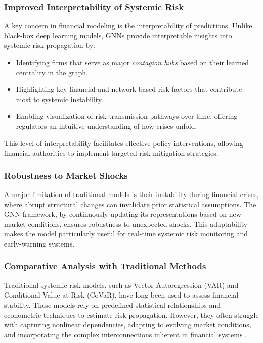 \documentclass[preprint,12pt,authoryear]{elsarticle}
\begin{document}
\subsubsection{Improved Interpretability of Systemic Risk}  

A key concern in financial modeling is the interpretability of predictions. Unlike black-box deep learning models, GNNs provide interpretable insights into systemic risk propagation by:
\begin{itemize}
    \item Identifying firms that serve as major \textit{contagion hubs} based on their learned centrality in the graph.
    \item Highlighting key financial and network-based risk factors that contribute most to systemic instability.
    \item Enabling visualization of risk transmission pathways over time, offering regulators an intuitive understanding of how crises unfold.
\end{itemize}
This level of interpretability facilitates effective policy interventions, allowing financial authorities to implement targeted risk-mitigation strategies.

\subsubsection{Robustness to Market Shocks}  

A major limitation of traditional models is their instability during financial crises, where abrupt structural changes can invalidate prior statistical assumptions. The GNN framework, by continuously updating its representations based on new market conditions, ensures robustness to unexpected shocks. This adaptability makes the model particularly useful for real-time systemic risk monitoring and early-warning systems.

\subsubsection{Comparative Analysis with Traditional Methods}  

Traditional systemic risk models, such as Vector Autoregression (VAR) and Conditional Value at Risk (CoVaR), have long been used to assess financial stability. These models rely on predefined statistical relationships and econometric techniques to estimate risk propagation. However, they often struggle with capturing nonlinear dependencies, adapting to evolving market conditions, and incorporating the complex interconnections inherent in financial systems \cite{bisias2012survey}.  
\end{document}
